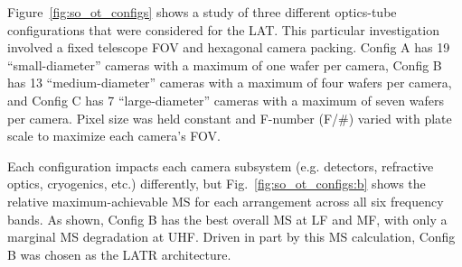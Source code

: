 Figure~\ref{fig:so_ot_configs} shows a study of three different optics-tube configurations that were considered for the LAT. This particular investigation involved a fixed telescope FOV and hexagonal camera packing. Config A has 19 ``small-diameter'' cameras with a maximum of one wafer per camera, Config B has 13 ``medium-diameter'' cameras with a maximum of four wafers per camera, and Config C has 7 ``large-diameter'' cameras with a maximum of seven wafers per camera. Pixel size was held constant and F-number (F/\#) varied with plate scale to maximize each camera's FOV.

Each configuration impacts each camera subsystem (e.g. detectors, refractive optics, cryogenics, etc.) differently, but Fig.~\ref{fig:so_ot_configs:b} shows the relative maximum-achievable MS for each arrangement across all six frequency bands. As shown, Config B has the best overall MS at LF and MF, with only a marginal MS degradation at UHF. Driven in part by this MS calculation, Config B was chosen as the LATR architecture.

